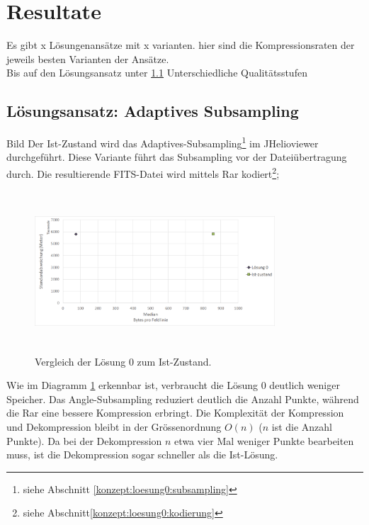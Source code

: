\section{Resultate}\label{resultate}
Es gibt x Lösungenansätze mit x varianten.  hier sind die Kompressionsraten der jeweils besten Varianten der Ansätze.\\
Bis auf den Lösungsansatz unter \ref{resultate:loesung0} Unterschiedliche Qualitätsstufen

\subsection{Lösungsansatz: Adaptives Subsampling} \label{resultate:loesung0}
Bild
Der Ist-Zustand wird das Adaptives-Subsampling\footnote{siehe Abschnitt \ref{konzept:loesung0:subsampling}} im JHelioviewer durchgeführt. Diese Variante führt das Subsampling vor der Dateiübertragung durch. Die resultierende FITS-Datei wird mittels Rar kodiert\footnote{siehe Abschnitt\ref{konzept:loesung0:kodierung}};
\begin{figure}[!htbp]
	\center
	\includegraphics[width=0.8\textwidth,height=6cm,keepaspectratio]{./pictures/resultate/loesung0/loesung0_0.png}
	\caption{Vergleich der Lösung 0 zum Ist-Zustand.}
	\label{resultate:loesung0:loesung0_0}
\end{figure}
Wie im Diagramm \ref{resultate:loesung0:loesung0_0} erkennbar ist, verbraucht die Lösung 0 deutlich weniger Speicher. Das Angle-Subsampling reduziert deutlich die Anzahl Punkte, während die Rar eine bessere Kompression erbringt. Die Komplexität der Kompression und Dekompression bleibt in der Grössenordnung $O(n)$ ($n$ ist die Anzahl Punkte). Da bei der Dekompression $n$ etwa vier Mal weniger Punkte bearbeiten muss, ist die Dekompression sogar schneller als die Ist-Lösung.\\
